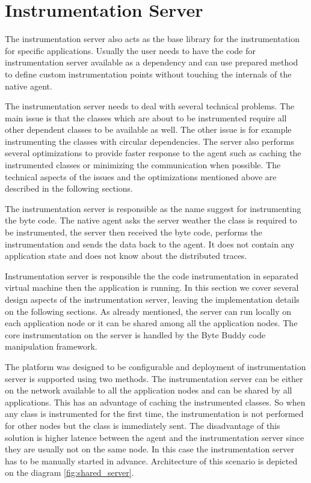 \section{Instrumentation Server}
\label{sec:inst_server}

The instrumentation server also acts as the base library for the instrumentation for specific applications. Usually the user needs to have the code for instrumentation server available as a dependency and can use prepared method to define custom instrumentation points without touching the internals of the native agent.

The instrumentation server needs to deal with several technical problems. The main issue is that the classes which are about to be instrumented require all other dependent classes to be available as well. The other issue is for example instrumenting the classes with circular dependencies. The server also performs several optimizations to provide faster response to the agent such as caching the instrumented classes or minimizing the communication when possible. The technical aspects of the issues and the optimizations mentioned above are described in the following sections.


The instrumentation server is responsible as the name suggest for instrumenting the byte code. The native agent asks the server weather the class is required to be instrumented, the server then received the byte code, performs the instrumentation and sends the data back to the agent. It does not contain any application state and does not know about the distributed traces.

Instrumentation server is responsible the the code instrumentation in separated virtual machine then the application is running. In this section we cover several design aspects of the instrumentation server, leaving the implementation details on the following sections. As already mentioned, the server can run locally on each application node or it can be shared among all the application nodes. The core instrumentation on the server is handled by the Byte Buddy code manipulation framework.

The platform was designed to be configurable and deployment of instrumentation server is supported using two methods. The instrumentation server can be either on the network available to all the application nodes and can be shared by all applications. This has an advantage of caching the instrumented classes. So when any class is instrumented for the first time, the instrumentation is not performed for other nodes but the class is immediately sent. The disadvantage of this solution is higher latence between the agent and the instrumentation server since they are usually not on the same node. In this case the instrumentation server has to be manually started in advance. Architecture of this scenario is depicted on the diagram \ref{fig:shared_server}.
 
